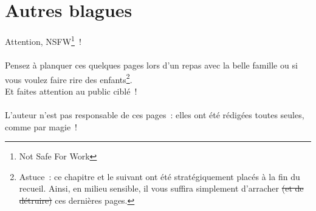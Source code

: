 \documentclass[10pt,a5paper,fullpage]{book}
\begin{document}
	\chapter{Autres blagues}
	Attention, NSFW\footnote{Not Safe For Work}~! \\ \\
	Pensez à planquer ces quelques pages lors d'un repas avec la belle famille ou si vous voulez faire rire des enfants\footnote{Astuce~: ce chapitre et le suivant ont été stratégiquement placés à la fin du recueil. Ainsi, en milieu sensible, il vous suffira simplement d'arracher \sout{(et de détruire)} ces dernières pages.}. \\Et faites attention au public ciblé~! 
	\\ \\L'auteur n'est pas responsable de ces pages~: elles ont été rédigées toutes seules, comme par magie~!
	\newpage
\end{document}
